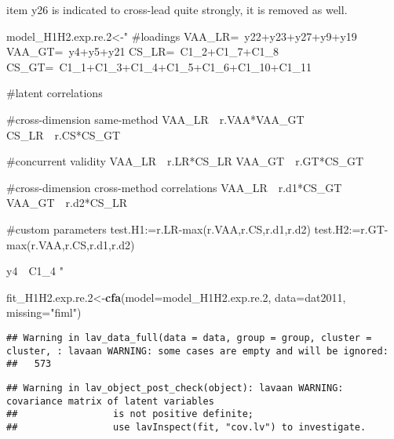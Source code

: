 \documentclass[
]{article}
\newenvironment{Shaded}{\begin{snugshade}}{\end{snugshade}}
\newcommand{\DataTypeTok}[1]{\textcolor[rgb]{0.13,0.29,0.53}{#1}}
\newcommand{\FloatTok}[1]{\textcolor[rgb]{0.00,0.00,0.81}{#1}}
\newcommand{\KeywordTok}[1]{\textcolor[rgb]{0.13,0.29,0.53}{\textbf{#1}}}
\newcommand{\NormalTok}[1]{#1}
\newcommand{\StringTok}[1]{\textcolor[rgb]{0.31,0.60,0.02}{#1}}
\begin{document}
item y26 is indicated to cross-lead quite strongly, it is removed as
well.

\begin{Shaded}
\begin{Highlighting}[]
\NormalTok{model_H1H2.exp.re}\FloatTok{.2}\NormalTok{<-}\StringTok{"}
\StringTok{#loadings}
\StringTok{VAA_LR=~y22+y23+y27+y9+y19}
\StringTok{VAA_GT=~y4+y5+y21}
\StringTok{CS_LR=~C1_2+C1_7+C1_8}
\StringTok{CS_GT=~C1_1+C1_3+C1_4+C1_5+C1_6+C1_10+C1_11}

\StringTok{#latent correlations}

\StringTok{#cross-dimension same-method}
\StringTok{VAA_LR~~r.VAA*VAA_GT}
\StringTok{CS_LR~~r.CS*CS_GT}

\StringTok{#concurrent validity}
\StringTok{VAA_LR~~r.LR*CS_LR}
\StringTok{VAA_GT~~r.GT*CS_GT}

\StringTok{#cross-dimension cross-method correlations}
\StringTok{VAA_LR~~r.d1*CS_GT}
\StringTok{VAA_GT~~r.d2*CS_LR}

\StringTok{#custom parameters}
\StringTok{test.H1:=r.LR-max(r.VAA,r.CS,r.d1,r.d2)}
\StringTok{test.H2:=r.GT-max(r.VAA,r.CS,r.d1,r.d2)}


\StringTok{y4~~C1_4}
\StringTok{"}
\end{Highlighting}
\end{Shaded}

\begin{Shaded}
\begin{Highlighting}[]
\NormalTok{fit_H1H2.exp.re}\FloatTok{.2}\NormalTok{<-}\KeywordTok{cfa}\NormalTok{(}\DataTypeTok{model=}\NormalTok{model_H1H2.exp.re}\FloatTok{.2}\NormalTok{,}
              \DataTypeTok{data=}\NormalTok{dat2011,}
              \DataTypeTok{missing=}\StringTok{"fiml"}\NormalTok{)}
\end{Highlighting}
\end{Shaded}

\begin{verbatim}
## Warning in lav_data_full(data = data, group = group, cluster = cluster, : lavaan WARNING: some cases are empty and will be ignored:
##   573
\end{verbatim}

\begin{verbatim}
## Warning in lav_object_post_check(object): lavaan WARNING: covariance matrix of latent variables
##                 is not positive definite;
##                 use lavInspect(fit, "cov.lv") to investigate.
\end{verbatim}
\end{document}
